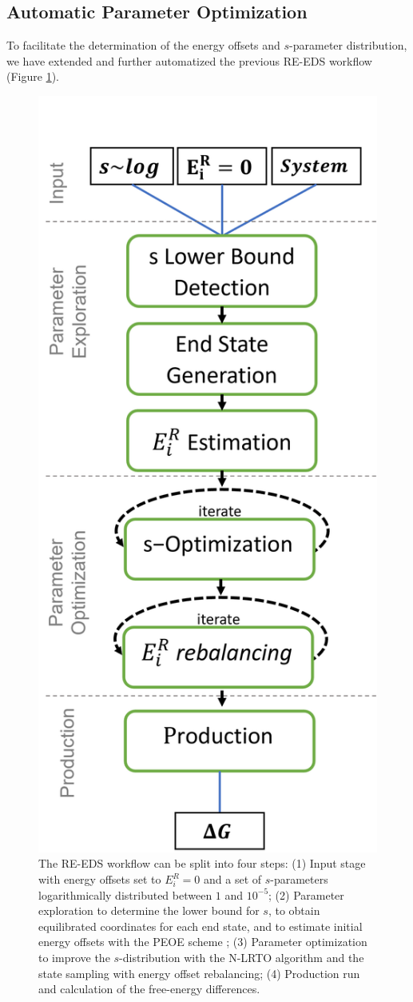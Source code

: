 \subsection{Automatic Parameter Optimization}
To facilitate the determination of the energy offsets and $s$-parameter distribution, we have extended and further automatized the previous \cite{Sidler2017} RE-EDS workflow (Figure \ref{fig:Workflow}).
\begin{figure}[h!]
    \centering
    \includegraphics[width=0.5\columnwidth]{fig/theory/RE_EDS_Pipeline.png}
    \caption{The RE-EDS workflow can be split into four steps: (1) Input stage with energy offsets set to $E_i^R=0$ and a set of $s$-parameters logarithmically distributed between $1$ and $10^{-5}$; (2) Parameter exploration to determine the lower bound for $s$, to obtain equilibrated coordinates for each end state, and to estimate initial energy offsets with the PEOE scheme \cite{Sidler2016}; (3) Parameter optimization to improve the $s$-distribution with the N-LRTO algorithm \cite{Sidler2017} and the state sampling with energy offset rebalancing; (4) Production run and calculation of the free-energy differences.}
    \label{fig:Workflow}
\end{figure}

